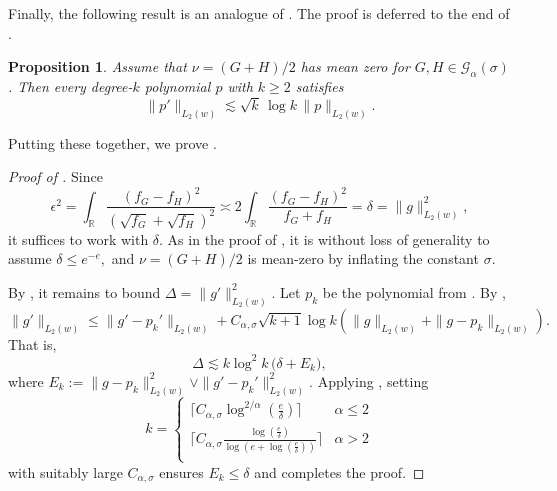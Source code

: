 \documentclass[letterpaper,11pt]{article}
\newcommand{\reals}{\mathbb{R}}
\newcommand{\pth}[1]{\left( #1 \right)}
\newtheorem{prop}[theorem]{Proposition}
\theoremstyle{definition}
\begin{document}
    Finally, the following result is an analogue of .
    The proof is deferred to the end of .

    \begin{prop}
      \label{prop:exp-bernstein}
      Assume that $\nu=(G+H)/2$ has mean zero for $G, H \in \mathcal G_\alpha(\sigma)$. Then every degree-$k$ polynomial
      $p$ with $k\geq 2$ satisfies
      \[
        \|p'\|_{L_2(w)}
        \lesssim
        \sqrt{k}\,\log k\,\|p\|_{L_2(w)}.
      \]
    \end{prop}


    Putting these together, we prove .

  \begin{proof}[Proof of ]
    Since
    \[
      \epsilon^2
      =
      \int_\reals \frac{(f_G-f_H)^2}{(\sqrt{f_G}+\sqrt{f_H})^2}
      \asymp
      2\int_\reals \frac{(f_G-f_H)^2}{f_G+f_H}
      =
      \delta = \|g\|_{L_2
      (w)}^2,
    \]
    it suffices to work with $\delta$. As in the proof of , it is without loss of generality to assume
    $
      \delta\leq e^{-e},
    $
    and
    $\nu=(G+H)/2$ is mean-zero by inflating the constant $\sigma$.

    By , it remains to bound $\Delta=\|g'\|_{L_2
      (w)}^2$.
    Let $p_k$ be the polynomial from . By
    ,
    \[
      \|g'\|_{L_2(w)}
      \leq
      \|g'-p_k'\|_{L_2(w)}
      +
      C_{\alpha,\sigma}\sqrt{k+1}\log k
      \pth{
        \|g\|_{L_2(w)}+\|g-p_k\|_{L_2(w)}
      }.
    \]
    That is,
    \[
      \Delta
      \lesssim
      k\log^2 k\,\bigl(\delta+E_k\bigr),
    \]
    where $E_k
      :=
      \|g-p_k\|_{L_2(w)}^2
      \vee
      \|g'-p_k'\|_{L_2(w)}^2$.
      Applying  , setting
    \[
      k=
      \begin{cases}
      \Big\lceil
        C_{\alpha,\sigma}
        \log^{2/\alpha}\pth{\frac{e}{\delta}}
      \Big\rceil & \alpha\leq 2\\
      \Big\lceil
        C_{\alpha,\sigma}
        \frac{\log\pth{\frac{e}{\delta}}}
        {\log\pth{e+\log\pth{\frac{e}{\delta}}}}
      \Big\rceil & \alpha > 2\\
      \end{cases}
    \]
    with suitably large $C_{\alpha,\sigma}$ ensures
    $E_k\leq \delta$ and completes the proof.
  \end{proof}
\end{document}
